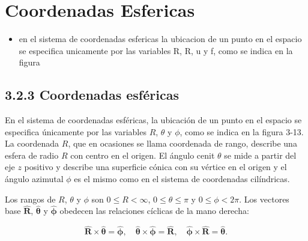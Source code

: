 \section{ Coordenadas Esfericas }
\begin{itemize}
    \item   en el sistema de coordenadas esfericas la ubicacion de un punto en el espacio se especifica unicamente por las variables R, R, u y f, como se
 indica en la figura  
\end{itemize}
\subsection*{3.2.3 Coordenadas esféricas}

En el sistema de coordenadas esféricas, la ubicación de un punto en el espacio se especifica únicamente por las variables \( R \), \( \theta \) y \( \phi \), como se indica en la figura 3-13. La coordenada \( R \), que en ocasiones se llama coordenada de rango, describe una esfera de radio \( R \) con centro en el origen. El ángulo cenit \( \theta \) se mide a partir del eje \( z \) positivo y describe una superficie cónica con su vértice en el origen y el ángulo azimutal \( \phi \) es el mismo como en el sistema de coordenadas cilíndricas.

Los rangos de \( R \), \( \theta \) y \( \phi \) son \( 0 \leq R < \infty \), \( 0 \leq \theta \leq \pi \) y \( 0 \leq \phi < 2\pi \). Los vectores base \( \hat{\mathbf{R}} \), \( \hat{\boldsymbol{\theta}} \) y \( \hat{\boldsymbol{\phi}} \) obedecen las relaciones cíclicas de la mano derecha:

\begin{equation}
\hat{\mathbf{R}} \times \hat{\boldsymbol{\theta}} = \hat{\boldsymbol{\phi}}, \quad
\hat{\boldsymbol{\theta}} \times \hat{\boldsymbol{\phi}} = \hat{\mathbf{R}}, \quad
\hat{\boldsymbol{\phi}} \times \hat{\mathbf{R}} = \hat{\boldsymbol{\theta}}. \tag{3.45}
\end{equation}

